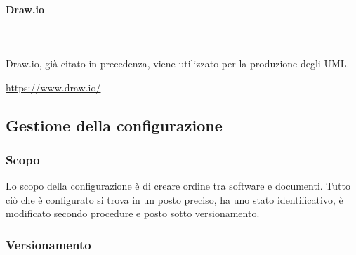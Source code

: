 		\paragraph{Draw.io} \mbox{}\\ \mbox{}\\
		Draw.io, già citato in precedenza, viene utilizzato per la produzione degli UML\glo. \newline
		\centerline{\url{https://www.draw.io/}}
		
	\subsection{Gestione della configurazione}
	\subsubsection{Scopo}
	Lo scopo della configurazione è di creare ordine tra software e documenti. Tutto ciò che è configurato si trova in un posto preciso, ha uno stato identificativo, è modificato secondo procedure e posto sotto versionamento.
	\subsubsection{Versionamento}
